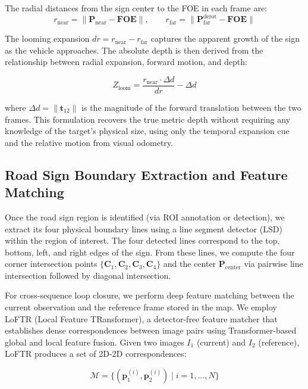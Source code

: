 \documentclass[runningheads]{llncs}
\begin{document}
The radial distances from the sign center to the FOE in each frame are:
\begin{equation}
r_{\text{near}} = \|\mathbf{P}_{\text{near}} - \mathbf{FOE}\|,\qquad
r_{\text{far}} = \|\mathbf{P}_{\text{far}}^{\text{derot}} - \mathbf{FOE}\|
\end{equation}

The looming expansion $dr = r_{\text{near}} - r_{\text{far}}$ captures the
apparent growth of the sign as the vehicle approaches. The absolute depth is then
derived from the relationship between radial expansion, forward motion, and depth:

\begin{equation}
Z_{\text{loom}} = \frac{r_{\text{near}} \cdot \Delta d}{dr} - \Delta d
\label{eq:looming}
\end{equation}

where $\Delta d = \|\mathbf{t}_{12}\|$ is the magnitude of the forward translation
between the two frames. This formulation recovers the true metric depth without
requiring any knowledge of the target's physical size, using only the temporal
expansion cue and the relative motion from visual odometry.

\subsection{Road Sign Boundary Extraction and Feature Matching}

Once the road sign region is identified (via ROI annotation or detection), we
extract its four physical boundary lines using a line segment detector (LSD)
within the region of interest. The four detected lines correspond to the top,
bottom, left, and right edges of the sign. From these lines, we compute the
four corner intersection points $\{\mathbf{C}_1, \mathbf{C}_2, \mathbf{C}_3,
\mathbf{C}_4\}$ and the center $\mathbf{P}_{\text{center}}$ via pairwise
line intersection followed by diagonal intersection.

For cross-sequence loop closure, we perform deep feature matching between
the current observation and the reference frame stored in the map. We employ
LoFTR (Local Feature TRansformer), a detector-free feature matcher that
establishes dense correspondences between image pairs using Transformer-based
global and local feature fusion. Given two images $I_1$ (current) and $I_2$
(reference), LoFTR produces a set of 2D-2D correspondences:

\begin{equation}
\mathcal{M} = \{( \mathbf{p}_1^{(i)}, \mathbf{p}_2^{(i)} ) \mid i = 1, \dots, N \}
\end{equation}
\end{document}
